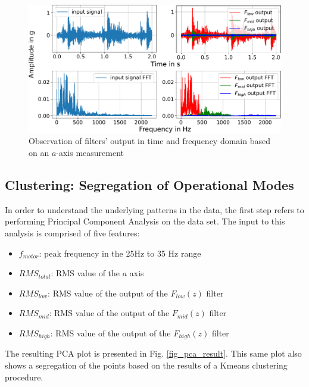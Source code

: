 \documentclass[conference]{IEEEtran}
\begin{document}
\begin{figure}[htbp]
\centering
\includegraphics[width=\columnwidth]{graphics/filters_sigresponse/filters_sigresponse_ohne.pdf}
\caption{Observation of filters' output in time and frequency domain based on an $a$-axis measurement}
\label{fig_filters_example_inout}
\end{figure}



\subsection{Clustering: Segregation of Operational Modes}
\label{sec_clustering_results}

In order to understand the underlying patterns in the data, the first step refers to performing Principal Component Analysis on the data set. The input to this analysis is comprised of five features:

\begin{itemize}
	\item $f_{motor}$: peak frequency in the 25Hz to 35 Hz range
	\item $RMS_{total}$: RMS value of the $a$ axis
	\item $RMS_{low}$: RMS value of the output of the $F_{low}(z)$ filter
	\item $RMS_{mid}$: RMS value of the output of the $F_{mid}(z)$ filter
	\item $RMS_{high}$: RMS value of the output of the $F_{high}(z)$ filter
\end{itemize}

The resulting PCA plot is presented in Fig. \ref{fig_pca_result}. This same plot also shows a segregation of the points based on the results of a Kmeans clustering procedure.
\end{document}
